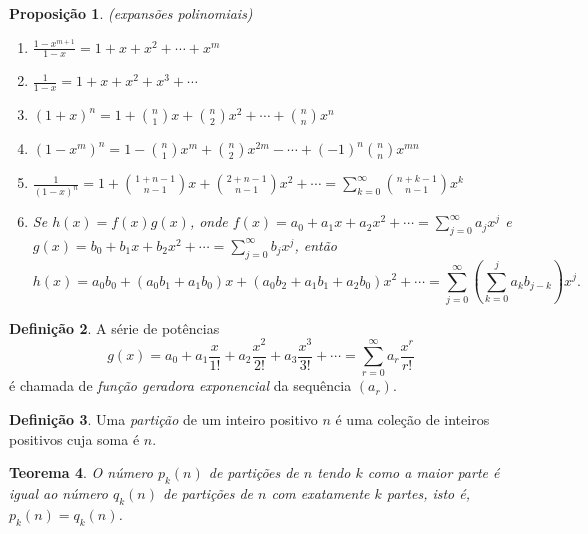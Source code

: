\documentclass[12pt]{article}
\theoremstyle{plain}
\newtheorem{thm}{Teorema}[section]
\newtheorem{prop}[thm]{Proposição}
\theoremstyle{definition}
\newtheorem{defn}[thm]{Definição}
\theoremstyle{remark}
\begin{document}
\begin{prop} (expansões polinomiais)
    \begin{enumerate}
        \item[\textup{(a)}] \(\displaystyle\frac{1-x^{m+1}}{1-x} = 1 + x + x^2 + \cdots + x^m\)
        \item[\textup{(b)}] \(\displaystyle\frac{1}{1-x} = 1 + x + x^2 + x^3 + \cdots\)
        \item[\textup{(c)}] \((1+x)^n = \displaystyle 1 + \binom{n}{1} x + \binom{n}{2} x^2 + \cdots + \binom{n}{n} x^n\)
        \item[\textup{(d)}] \((1-x^m)^n = \displaystyle 1 - \binom{n}{1} x^m + \binom{n}{2} x^{2m} - \cdots + (-1)^n \binom{n}{n} x^{mn}\)
        \item[\textup{(e)}] \(\displaystyle \frac{1}{(1-x)^n} = \displaystyle 1 + \binom{1+n-1}{n-1} x + \binom{2+n-1}{n-1} x^2 + \cdots = \sum_{k=0}^{\infty} \binom{n+k-1}{n-1} x^k\)
        \item[\textup{(f)}] Se \(h(x)=f(x)g(x)\), onde \(\displaystyle f(x)=a_0 + a_1 x + a_2 x^2 + \cdots = \sum_{j=0}^{\infty} a_j x^j\) e \(\displaystyle g(x)=b_0 + b_1 x + b_2 x^2 + \cdots = \sum_{j=0}^{\infty} b_j x^j\), então
        \begin{equation}
            h(x) = a_0b_0 + (a_0b_1 + a_1b_0)x + (a_0b_2 + a_1b_1 + a_2b_0)x^2 + \cdots = \sum_{j=0}^{\infty} \left( \sum_{k=0}^{j} a_k b_{j-k} \right) x^j.
        \end{equation}
    \end{enumerate}
\end{prop}

\begin{defn}
    A série de potências
    \begin{equation}
        g(x) = a_0 + a_1 \frac{x}{1!} + a_2 \frac{x^2}{2!} + a_3 \frac{x^3}{3!} + \cdots = \sum_{r=0}^{\infty} a_r \frac{x^r}{r!}
    \end{equation}
    \noindent é chamada de \emph{função geradora exponencial} da sequência \((a_r)\).
\end{defn}

\begin{defn}
    Uma \emph{partição} de um inteiro positivo \(n\) é uma coleção de inteiros positivos cuja soma é \(n\).
\end{defn}

\begin{thm} 
    O número \(p_k(n)\) de partições de \(n\) tendo \(k\) como a maior parte é igual ao número \(q_k(n)\) de partições de \(n\) com exatamente \(k\) partes, isto é, \(p_k(n) = q_k(n)\).
\end{thm}
\end{document}
